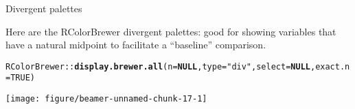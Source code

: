\documentclass[table]{beamer}\usepackage[]{graphicx}\usepackage[]{color}
\makeatletter
\def\maxwidth{ %
  \ifdim\Gin@nat@width>\linewidth
    \linewidth
  \else
    \Gin@nat@width
  \fi
}
\newcommand{\hlnum}[1]{\textcolor[rgb]{0.686,0.059,0.569}{#1}}%
\newcommand{\hlstr}[1]{\textcolor[rgb]{0.192,0.494,0.8}{#1}}%
\newcommand{\hlopt}[1]{\textcolor[rgb]{0,0,0}{#1}}%
\newcommand{\hlstd}[1]{\textcolor[rgb]{0.345,0.345,0.345}{#1}}%
\newcommand{\hlkwa}[1]{\textcolor[rgb]{0.161,0.373,0.58}{\textbf{#1}}}%
\newcommand{\hlkwc}[1]{\textcolor[rgb]{0.333,0.667,0.333}{#1}}%
\newcommand{\hlkwd}[1]{\textcolor[rgb]{0.737,0.353,0.396}{\textbf{#1}}}%
\newenvironment{kframe}{%
 \def\at@end@of@kframe{}%
 \ifinner\ifhmode%
  \def\at@end@of@kframe{\end{minipage}}%
  \begin{minipage}{\columnwidth}%
 \fi\fi%
 \def\FrameCommand##1{\hskip\@totalleftmargin \hskip-\fboxsep
 \colorbox{shadecolor}{##1}\hskip-\fboxsep
     \hskip-\linewidth \hskip-\@totalleftmargin \hskip\columnwidth}%
 \MakeFramed {\advance\hsize-\width
   \@totalleftmargin\z@ \linewidth\hsize
   \@setminipage}}%
 {\par\unskip\endMakeFramed%
 \at@end@of@kframe}
\newenvironment{knitrout}{}{} %
\makeatother
\begin{document}
\begin{frame}[fragile]{Divergent palettes}

Here are the RColorBrewer divergent palettes: good for showing variables that have a natural midpoint to facilitate a ``baseline'' comparison.
\begin{knitrout}\tiny
{}\color{fgcolor}\begin{kframe}
\begin{alltt}
\hlstd{RColorBrewer}\hlopt{::}\hlkwd{display.brewer.all}\hlstd{(}\hlkwc{n}\hlstd{=}\hlkwa{NULL}\hlstd{,} \hlkwc{type}\hlstd{=}\hlstr{"div"}\hlstd{,} \hlkwc{select}\hlstd{=}\hlkwa{NULL}\hlstd{,} \hlkwc{exact.n}\hlstd{=}\hlnum{TRUE}\hlstd{)}
\end{alltt}
\end{kframe}

{\centering \texttt{[image: figure/beamer-unnamed-chunk-17-1]} 

}


\end{knitrout}

\end{frame}

\end{document}
